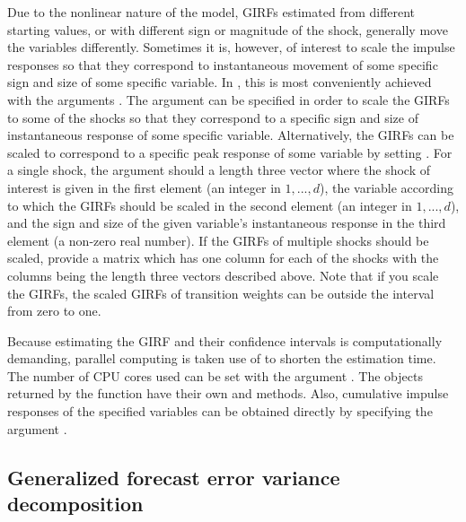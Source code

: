 \documentclass[nojss]{jss}
\begin{document}
Due to the nonlinear nature of the model, GIRFs estimated from different starting values, or with different sign or magnitude of the shock, generally move the variables differently. Sometimes it is, however, of interest to scale the impulse responses so that they correspond to instantaneous movement of some specific sign and size of some specific variable. In , this is most conveniently achieved with the arguments . The argument  can be specified in order to scale the GIRFs to some of the shocks so that they correspond to a specific sign and size of instantaneous response of some specific variable. Alternatively, the GIRFs can be scaled to correspond to a specific peak response of some variable by setting . For a single shock, the argument  should a length three vector where the shock of interest is given in the first element (an integer in $1,...,d$), the variable according to which the GIRFs should be scaled in the second element (an integer in $1,...,d$), and the sign and size of the given variable's instantaneous response in the third element (a non-zero real number). If the GIRFs of multiple shocks should be scaled, provide a matrix which has one column for each of the shocks with the columns being the length three vectors described above. Note that if you scale the GIRFs, the scaled GIRFs of transition weights can be outside the interval from zero to one.

Because estimating the GIRF and their confidence intervals is computationally demanding, parallel computing is taken use of to shorten the estimation time. The number of CPU cores used can be set with the argument . The objects returned by the  function have their own  and  methods. Also, cumulative impulse responses of the specified variables can be obtained directly by specifying the argument .

\subsection{Generalized forecast error variance decomposition}
\end{document}
